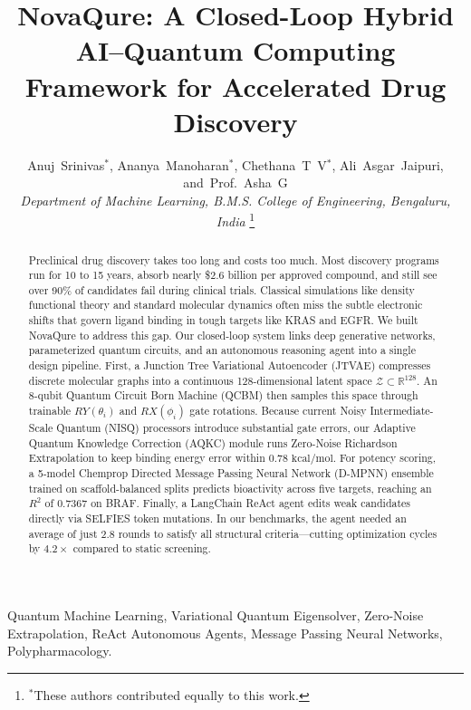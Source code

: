 \documentclass[journal,10pt,twocolumn]{IEEEtran}
\begin{document}
\title{NovaQure: A Closed-Loop Hybrid AI--Quantum Computing Framework for Accelerated Drug Discovery}

\author{Anuj~Srinivas$^*$, 
        Ananya~Manoharan$^*$, 
        Chethana~T~V$^*$, 
        Ali~Asgar~Jaipuri, 
        and~Prof.~Asha~G \\
\textit{Department of Machine Learning, B.M.S. College of Engineering, Bengaluru, India}%
\thanks{$^*$These authors contributed equally to this work.}%
}
\maketitle

\begin{abstract}
Preclinical drug discovery takes too long and costs too much. Most discovery programs run for 10 to 15 years, absorb nearly \$2.6 billion per approved compound, and still see over 90\% of candidates fail during clinical trials. Classical simulations like density functional theory and standard molecular dynamics often miss the subtle electronic shifts that govern ligand binding in tough targets like KRAS and EGFR. We built NovaQure to address this gap. Our closed-loop system links deep generative networks, parameterized quantum circuits, and an autonomous reasoning agent into a single design pipeline. First, a Junction Tree Variational Autoencoder (JTVAE) compresses discrete molecular graphs into a continuous 128-dimensional latent space $\mathcal{Z} \subset \mathbb{R}^{128}$. An 8-qubit Quantum Circuit Born Machine (QCBM) then samples this space through trainable $RY(\theta_i)$ and $RX(\phi_i)$ gate rotations. Because current Noisy Intermediate-Scale Quantum (NISQ) processors introduce substantial gate errors, our Adaptive Quantum Knowledge Correction (AQKC) module runs Zero-Noise Richardson Extrapolation to keep binding energy error within $0.78\text{ kcal/mol}$. For potency scoring, a 5-model Chemprop Directed Message Passing Neural Network (D-MPNN) ensemble trained on scaffold-balanced splits predicts bioactivity across five targets, reaching an $R^2$ of 0.7367 on BRAF. Finally, a LangChain ReAct agent edits weak candidates directly via SELFIES token mutations. In our benchmarks, the agent needed an average of just 2.8 rounds to satisfy all structural criteria---cutting optimization cycles by $4.2\times$ compared to static screening.
\end{abstract}

\begin{IEEEkeywords}
Quantum Machine Learning, Variational Quantum Eigensolver, Zero-Noise Extrapolation, ReAct Autonomous Agents, Message Passing Neural Networks, Polypharmacology.
\end{IEEEkeywords}
\end{document}

